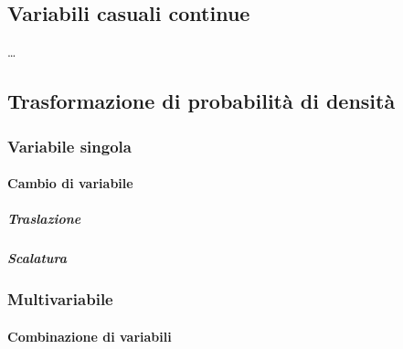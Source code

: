 \documentclass[letterpaper,10pt,italian]{jupyterBook}
\begin{document}
\subsection{Variabili casuali continue}
\label{\detokenize{ch/statistics/random_variables:variabili-casuali-continue}}
\sphinxAtStartPar
…

\sphinxstepscope


\subsection{Trasformazione di probabilità di densità}
\label{\detokenize{ch/statistics/rv_pdf_transformations:trasformazione-di-probabilita-di-densita}}\label{\detokenize{ch/statistics/rv_pdf_transformations::doc}}

\subsubsection{Variabile singola}
\label{\detokenize{ch/statistics/rv_pdf_transformations:variabile-singola}}

\paragraph{Cambio di variabile}
\label{\detokenize{ch/statistics/rv_pdf_transformations:cambio-di-variabile}}

\subparagraph{Traslazione}
\label{\detokenize{ch/statistics/rv_pdf_transformations:traslazione}}

\subparagraph{Scalatura}
\label{\detokenize{ch/statistics/rv_pdf_transformations:scalatura}}

\subsubsection{Multi\sphinxhyphen{}variabile}
\label{\detokenize{ch/statistics/rv_pdf_transformations:multi-variabile}}

\paragraph{Combinazione di variabili}
\label{\detokenize{ch/statistics/rv_pdf_transformations:combinazione-di-variabili}}
\end{document}
